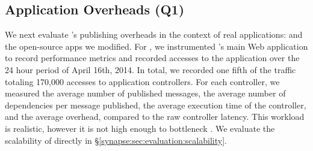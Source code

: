 \setlength{\tabcolsep}{4pt}

\subsection{Application Overheads (Q1)}
\label{synapse:sec:evaluation:overhead}

We next evaluate \synapse's publishing overheads in the context of real
applications: \crowdtap and the open-source apps we modified. For \crowdtap, we
instrumented \crowdtap's main Web application to record performance metrics and
recorded accesses to the application over the 24 hour period of April 16th,
2014. In total, we recorded one fifth of the traffic totaling 170,000 accesses
to application controllers. For each controller, we measured the average
number of published messages, the average number of dependencies per message
published, the average execution time of the controller, and the average
\synapse overhead, compared to the raw controller latency. This workload is
realistic, however it is not high enough to bottleneck \synapse. We evaluate
the scalability of \synapse directly in \S\ref{synapse:sec:evaluation:scalability}.

